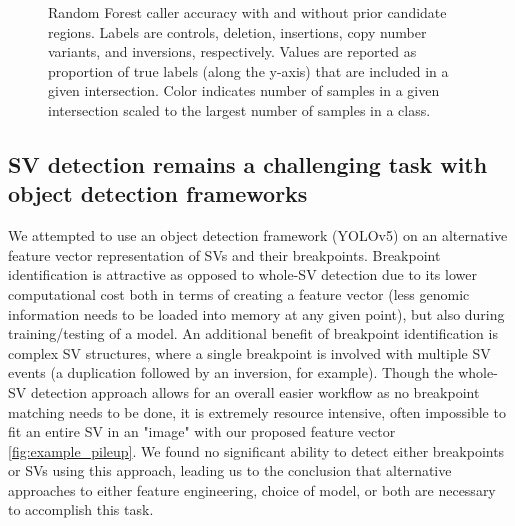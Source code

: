 \begin{figure}
    \centering
    \caption[Random Forest caller accuracy with and without prior candidate regions.]{Random Forest caller accuracy with and without prior candidate regions. Labels are controls, deletion, insertions, copy number variants, and inversions, respectively. Values are reported as proportion of true labels (along the y-axis) that are included in a given intersection. Color indicates number of samples in a given intersection scaled to the largest number of samples in a class.}
    \label{fig:caller_comparison}
\end{figure}

\subsection{SV detection remains a challenging task with object detection frameworks}

We attempted to use an object detection framework (YOLOv5) on an alternative feature vector representation of SVs and their breakpoints. Breakpoint identification is attractive as opposed to whole-SV detection due to its lower computational cost both in terms of creating a feature vector (less genomic information needs to be loaded into memory at any given point), but also during training/testing of a model. An additional benefit of breakpoint identification is complex SV structures, where a single breakpoint is involved with multiple SV events (a duplication followed by an inversion, for example). Though the whole-SV detection approach allows for an overall easier workflow as no breakpoint matching needs to be done, it is extremely resource intensive, often impossible to fit an entire SV in an "image" with our proposed feature vector \ref{fig:example_pileup}. We found no significant ability to detect either breakpoints or SVs using this approach, leading us to the conclusion that alternative approaches to either feature engineering, choice of model, or both are necessary to accomplish this task. 

